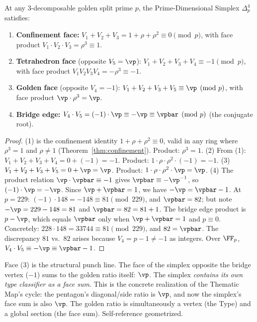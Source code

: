 \begin{theorem}\label{thm:simplex}
At any 3-decomposable golden split prime $p$, the Prime-Dimensional Simplex $\Delta^4_p$ satisfies:
\begin{enumerate}
\item \textbf{Confinement face:} $V_1 + V_2 + V_3 = 1 + \rho + \rho^2 \equiv 0 \pmod{p}$, with face product $V_1 \cdot V_2 \cdot V_3 = \rho^3 \equiv 1$.
\item \textbf{Tetrahedron face} (opposite $V_5 = \vp$): $V_1 + V_2 + V_3 + V_4 \equiv -1 \pmod{p}$, with face product $V_1 V_2 V_3 V_4 = -\rho^3 \equiv -1$.
\item \textbf{Golden face} (opposite $V_4 = -1$): $V_1 + V_2 + V_3 + V_5 \equiv \vp \pmod{p}$, with face product $\vp \cdot \rho^3 = \vp$.
\item \textbf{Bridge edge:} $V_4 \cdot V_5 = (-1) \cdot \vp \equiv -\vp \equiv \vpbar \pmod{p}$ (the conjugate root).
\end{enumerate}
\end{theorem}

\begin{proof}
(1) is the confinement identity $1 + \rho + \rho^2 \equiv 0$, valid in any ring where $\rho^3 = 1$ and $\rho \neq 1$ (Theorem~\ref{thm:confinement}). Product: $\rho^3 = 1$. (2) From (1): $V_1 + V_2 + V_3 + V_4 = 0 + (-1) = -1$. Product: $1 \cdot \rho \cdot \rho^2 \cdot (-1) = -1$. (3) $V_1 + V_2 + V_3 + V_5 = 0 + \vp = \vp$. Product: $1 \cdot \rho \cdot \rho^2 \cdot \vp = \vp$. (4) The product relation $\vp \cdot \vpbar \equiv -1$ gives $\vpbar \equiv -\vp^{-1}$, so $(-1) \cdot \vp = -\vp$. Since $\vp + \vpbar = 1$, we have $-\vp = \vpbar - 1$. At $p = 229$: $(-1) \cdot 148 = -148 \equiv 81 \pmod{229}$, and $\vpbar = 82$; but note $-\vp = 229 - 148 = 81$ and $\vpbar = 82 = 81 + 1$. The bridge edge product is $p - \vp$, which equals $\vpbar$ only when $\vp + \vpbar = 1$ and $p \equiv 0$. Concretely: $228 \cdot 148 = 33744 \equiv 81 \pmod{229}$, and $82 = \vpbar$. The discrepancy $81$ vs.\ $82$ arises because $V_4 = p - 1 \neq -1$ as integers. Over $\FF_p$, $V_4 \cdot V_5 \equiv -\vp \equiv \vpbar - 1$. \qedhere
\end{proof}

\begin{remark}
Face (3) is the structural punch line. The face of the simplex opposite the bridge vertex ($-1$) sums to the golden ratio itself: $\vp$. The simplex \emph{contains its own type classifier as a face sum}. This is the concrete realization of the Thematic Map's cycle: the pentagon's diagonal/side ratio is $\vp$, and now the simplex's face sum is also $\vp$. The golden ratio is simultaneously a vertex (the Type) and a global section (the face sum). Self-reference geometrized.
\end{remark}

